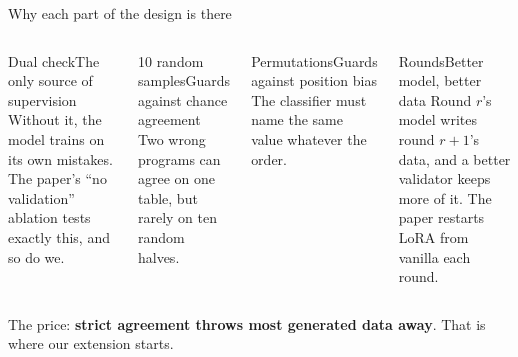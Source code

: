 \documentclass[11pt,aspectratio=169]{beamer}
\begin{document}
\begin{frame}{Why each part of the design is there}
\vspace{0.1cm}
\begin{columns}[T]
\begin{tscard}[tsnavy]{Dual check}{The only source of supervision}
Without it, the model trains on its own mistakes. The paper's ``no validation'' ablation tests exactly this, and so do we.
\end{tscard}
\vspace{0.05cm}
\begin{tscard}[tsnavy]{10 random samples}{Guards against chance agreement}
Two wrong programs can agree on one table, but rarely on ten random halves.
\end{tscard}
\begin{tscard}[tsred]{Permutations}{Guards against position bias}
The classifier must name the same value whatever the order.
\end{tscard}
\vspace{0.05cm}
\begin{tscard}[tsred]{Rounds}{Better model, better data}
Round $r$'s model writes round $r{+}1$'s data, and a better validator keeps more of it. The paper restarts LoRA from vanilla each round.
\end{tscard}
\end{columns}
\vspace{0.25cm}
\begin{tscallout}[tspanel]\small The price: \textbf{strict agreement throws most generated data away}. That is where our extension starts.\end{tscallout}
\end{frame}
\end{document}

